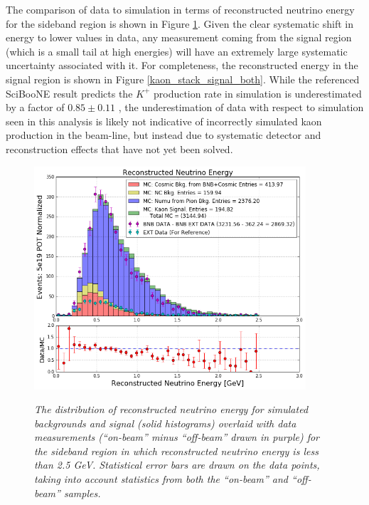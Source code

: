 The comparison of data to simulation in terms of reconstructed neutrino energy for the sideband region is shown in Figure \ref{kaon_stack_sideband_both}. Given the clear systematic shift in energy to lower values in data, any measurement coming from the signal region (which is a small tail at high energies) will have an extremely large systematic uncertainty associated with it. For completeness, the reconstructed energy in the signal region is shown in Figure \ref{kaon_stack_signal_both}. While the referenced SciBooNE result predicts the $K^+$ production rate in simulation is underestimated by a factor of $0.85\pm0.11$ \cite{gary_kaon_production_paper}, the underestimation of data with respect to simulation seen in this analysis is likely not indicative of incorrectly simulated kaon production in the beam-line, but instead due to systematic detector and reconstruction effects that have not yet been solved. %


\begin{figure}[ht!]
\centering
	\includegraphics[width=0.9\textwidth]{Figures/kaon_both_sideband.png} \\
\caption{\textit{The distribution of reconstructed neutrino energy for simulated backgrounds and signal (solid histograms) overlaid with data measurements (``on-beam'' minus ``off-beam'' drawn in purple) for the sideband region in which reconstructed neutrino energy is less than 2.5 GeV. Statistical error bars are drawn on the data points, taking into account statistics from both the ``on-beam'' and ``off-beam'' samples.}}\label{kaon_stack_sideband_both}
\end{figure}



